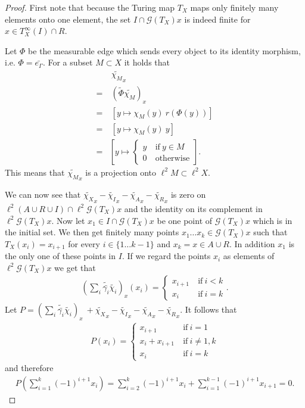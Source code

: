 \documentclass[12pt,a4paper]{scrartcl}
\theoremstyle{plain}
\theoremstyle{definition}
\newcommand{\2}{\mathbb{Z} / 2 \mathbb{Z}}
\newcommand{\G}{\mathcal{G}}
\newcommand{\1}{\bar{1}}
\newcommand{\0}{\bar{0}}
\begin{document}
\begin{proof}
	First note that because the Turing map $T_X$ maps only finitely many elements onto one element, the set $I \cap \G (T_X)x$ is indeed finite for $x \in T_X^\infty(I) \cap R$.
	 
	Let $\Phi$ be the measurable edge which sends every object to its identity morphism, i.e. $\Phi = \bar{e_\Gamma}$. For a subset $M \subset X$ it holds that
	\begin{align*}
		 &~ \widetilde{\chi_M}_x \\
		=&~ (\tilde{\Phi}\widetilde{\chi_M})_x \\
		=&~ [y \mapsto \chi_{M}(y) ~ r(\Phi(y))] \\
		=&~ [y \mapsto \chi_{M}(y) ~ y] \\
		=& \left[y \mapsto \begin{cases}
			y &~ \text{if} ~ y \in M \\
			0 &~ \text{otherwise}
		\end{cases}\right].
	\end{align*}
	This means that $\widetilde{\chi_M}_x$ is a projection onto $\ell^2M \subset \ell^2 X$.
	
	We can now see that $\widetilde{\chi_X}_x - \widetilde{\chi_I}_x - \widetilde{\chi_A}_x - \widetilde{\chi_R}_x$ is zero on $\ell^2(A \cup R \cup I) \cap \ell^2 \G (T_X)x$ and the identity on its complement in $\ell^2 \G (T_X)x$. Now let $x_1 \in I \cap \G (T_X)x$ be  one point of $\G (T_X)x$ which is in the initial set. We then get finitely many points $x_1 \ldots x_k \in \G (T_X)x$ such that $T_X(x_i) = x_{i + 1}$ for every $i \in \{1 \ldots k - 1\}$ and $x_k = x \in A \cup R$. In addition $x_1$ is the only one of these points in $I$. If we regard the points $x_i$ as elements of $\ell^2 \G (T_X)x$ we get that 
	\begin{align*}
		(\sum_{i} \widetilde{\bar{\gamma_i}} \widetilde{\chi_i})_x(x_i) =\begin{cases}
		x_{i+1} &~ \text{if} ~ i < k \\
		x_i &~ \text{if} ~ i = k
		\end{cases}.
	\end{align*}
	Let $P = (\sum_{i} \widetilde{\bar{\gamma_i}} \widetilde{\chi_i})_x \ + \widetilde{\chi_X}_x - \widetilde{\chi_I}_x - \widetilde{\chi_A}_x - \widetilde{\chi_R}_x$. It follows that
	\begin{align*}
		P(x_i) = \begin{cases}
		x_{i + 1} &~ \text{if} ~ i = 1 \\
		x_{i} + x_{i + 1} &~ \text{if} ~ i \neq 1, k \\
		x_{i} &~ \text{if} ~ i = k
		\end{cases}
	\end{align*}
	and therefore 
	\begin{align*}
		P(\sum_{i = 1}^{k} (-1)^{i + 1} x_i) =\sum_{i = 2}^{k} (-1)^{i+1} x_{i} + \sum_{i = 1}^{k-1} (-1)^{i+1} x_{i+1} = 0.
	\end{align*}
	

\end{proof}
\end{document}
